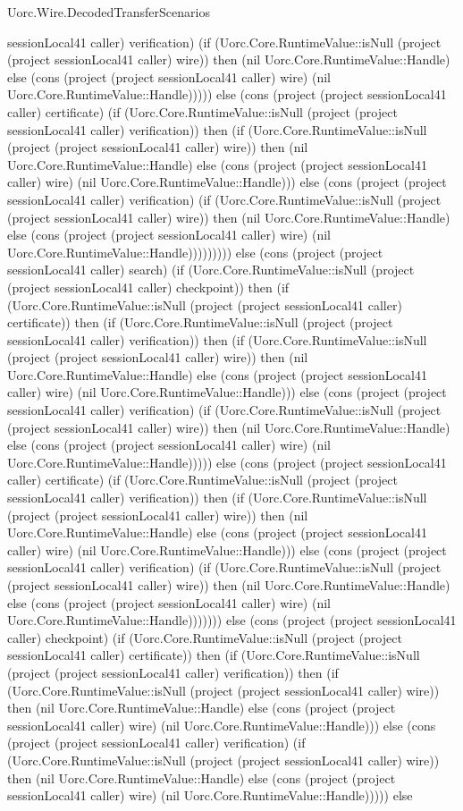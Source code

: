 \begin{lexlean}{Uorc.Wire.DecodedTransferScenarios}
\begin{semanticmodule}
{sessionLocal41 caller) verification) (if (Uorc.Core.RuntimeValue::isNull (project (project sessionLocal41 caller) wire)) then (nil Uorc.Core.RuntimeValue::Handle) else (cons (project (project sessionLocal41 caller) wire) (nil Uorc.Core.RuntimeValue::Handle))))) else (cons (project (project sessionLocal41 caller) certificate) (if (Uorc.Core.RuntimeValue::isNull (project (project sessionLocal41 caller) verification)) then (if (Uorc.Core.RuntimeValue::isNull (project (project sessionLocal41 caller) wire)) then (nil Uorc.Core.RuntimeValue::Handle) else (cons (project (project sessionLocal41 caller) wire) (nil Uorc.Core.RuntimeValue::Handle))) else (cons (project (project sessionLocal41 caller) verification) (if (Uorc.Core.RuntimeValue::isNull (project (project sessionLocal41 caller) wire)) then (nil Uorc.Core.RuntimeValue::Handle) else (cons (project (project sessionLocal41 caller) wire) (nil Uorc.Core.RuntimeValue::Handle))))))))) else (cons (project (project sessionLocal41 caller) search) (if (Uorc.Core.RuntimeValue::isNull (project (project sessionLocal41 caller) checkpoint)) then (if (Uorc.Core.RuntimeValue::isNull (project (project sessionLocal41 caller) certificate)) then (if (Uorc.Core.RuntimeValue::isNull (project (project sessionLocal41 caller) verification)) then (if (Uorc.Core.RuntimeValue::isNull (project (project sessionLocal41 caller) wire)) then (nil Uorc.Core.RuntimeValue::Handle) else (cons (project (project sessionLocal41 caller) wire) (nil Uorc.Core.RuntimeValue::Handle))) else (cons (project (project sessionLocal41 caller) verification) (if (Uorc.Core.RuntimeValue::isNull (project (project sessionLocal41 caller) wire)) then (nil Uorc.Core.RuntimeValue::Handle) else (cons (project (project sessionLocal41 caller) wire) (nil Uorc.Core.RuntimeValue::Handle))))) else (cons (project (project sessionLocal41 caller) certificate) (if (Uorc.Core.RuntimeValue::isNull (project (project sessionLocal41 caller) verification)) then (if (Uorc.Core.RuntimeValue::isNull (project (project sessionLocal41 caller) wire)) then (nil Uorc.Core.RuntimeValue::Handle) else (cons (project (project sessionLocal41 caller) wire) (nil Uorc.Core.RuntimeValue::Handle))) else (cons (project (project sessionLocal41 caller) verification) (if (Uorc.Core.RuntimeValue::isNull (project (project sessionLocal41 caller) wire)) then (nil Uorc.Core.RuntimeValue::Handle) else (cons (project (project sessionLocal41 caller) wire) (nil Uorc.Core.RuntimeValue::Handle))))))) else (cons (project (project sessionLocal41 caller) checkpoint) (if (Uorc.Core.RuntimeValue::isNull (project (project sessionLocal41 caller) certificate)) then (if (Uorc.Core.RuntimeValue::isNull (project (project sessionLocal41 caller) verification)) then (if (Uorc.Core.RuntimeValue::isNull (project (project sessionLocal41 caller) wire)) then (nil Uorc.Core.RuntimeValue::Handle) else (cons (project (project sessionLocal41 caller) wire) (nil Uorc.Core.RuntimeValue::Handle))) else (cons (project (project sessionLocal41 caller) verification) (if (Uorc.Core.RuntimeValue::isNull (project (project sessionLocal41 caller) wire)) then (nil Uorc.Core.RuntimeValue::Handle) else (cons (project (project sessionLocal41 caller) wire) (nil Uorc.Core.RuntimeValue::Handle))))) else }
\end{semanticmodule}
\end{lexlean}
